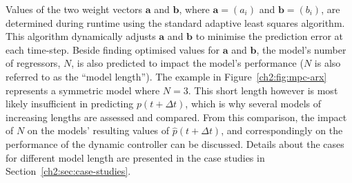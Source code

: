 Values of the two weight vectors $\textbf{a}$ and $\textbf{b}$, where $\textbf{a} = (a_i)$ and $\textbf{b} = (b_i)$, are determined during runtime using the standard adaptive least squares algorithm.
This algorithm dynamically adjusts $\textbf{a}$ and $\textbf{b}$ to minimise the prediction error at each time-step.
Beside finding optimised values for $\textbf{a}$ and $\textbf{b}$, the model's number of regressors, $N$, is also predicted to impact the model's performance ($N$ is also referred to as the ``model length'').
The example in Figure~\ref{ch2:fig:mpc-arx} represents a symmetric model where $N=3$.
This short length however is most likely insufficient in predicting $p(t+\Delta t)$, which is why several models of increasing lengths are assessed and compared.
From this comparison, the impact of $N$ on the models' resulting values of $\hat{p}(t+\Delta t)$, and correspondingly on the performance of the dynamic controller can be discussed.
Details about the cases for different model length are presented in the case studies in Section~\ref{ch2:sec:case-studies}.










